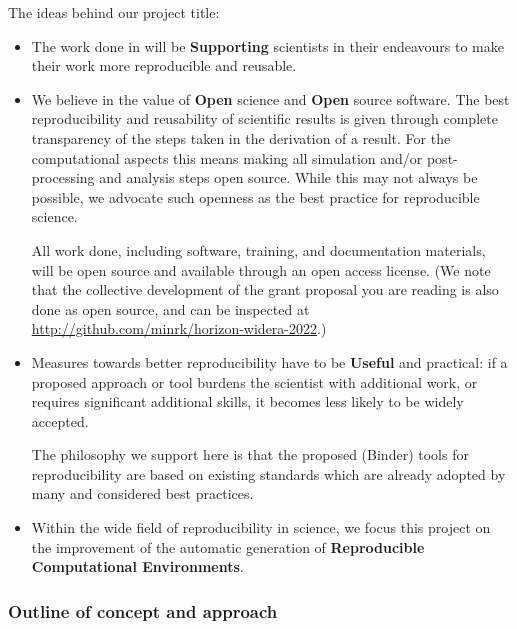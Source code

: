   The ideas behind our project title:
\begin{itemize}
\item The work done in \TheProject will be \textbf{Supporting} scientists in their
  endeavours to make their work more reproducible and reusable.
\item We believe in the value of \textbf{Open} science and \textbf{Open} source software.
  The best reproducibility and reusability of scientific results is given through
  complete transparency of the steps taken in the derivation of a result. For
  the computational aspects this means making all simulation and/or
  post-processing and analysis steps open source. While this may not always be
  possible, we advocate such openness as the best practice for reproducible science.

  All work done, including software, training, and documentation materials, will
  be open source and available through an open access license. (We note that the
  collective development of the grant proposal you are reading is also done as
  open source, and can be inspected at {\footnotesize \url{http://github.com/minrk/horizon-widera-2022}}.)

\item Measures towards better reproducibility have to be \textbf{Useful} and
  practical: if a proposed approach or tool burdens the scientist with
  additional work, or requires significant additional skills, it becomes less
  likely to be widely accepted.

  The philosophy we support here is that the proposed (Binder) tools for
  reproducibility are based on existing standards which are already
  adopted by many and considered best practices.

\item Within the wide field of reproducibility in science, we focus this
  project on the improvement of the automatic generation of \textbf{Reproducible
    Computational Environments}.
\end{itemize}

\subsubsection{Outline of concept and approach}

